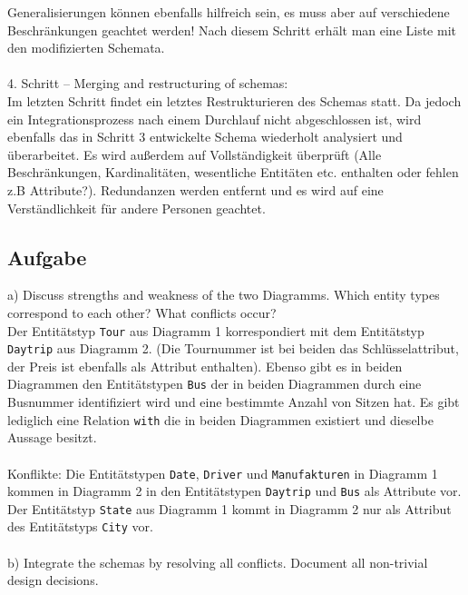 \documentclass[11pt,a4paper,DIV=9]{scrartcl}
\newcounter{temp}
\newcommand{\aufgabe}[1]{
  \setcounter{temp}{\value{subsection}}
  \setcounter{subsection}{#1}
  \addtocounter{subsection}{-1}
  \subsection{Aufgabe}
  \setcounter{subsection}{\value{temp}}
}
\begin{document}
Generalisierungen k\"onnen ebenfalls hilfreich sein, es muss aber auf verschiedene Beschr\"ankungen geachtet werden!
Nach diesem Schritt erh\"alt man eine Liste mit den modifizierten Schemata.
\\\\ 4. Schritt -- Merging and restructuring of schemas: \\
Im letzten Schritt findet ein letztes Restrukturieren des Schemas statt. Da jedoch ein Integrationsprozess nach einem Durchlauf nicht abgeschlossen ist, wird ebenfalls das in Schritt 3 entwickelte Schema wiederholt analysiert und \"uberarbeitet. Es wird au{\ss}erdem auf Vollst\"andigkeit \"uberpr\"uft (Alle Beschr\"ankungen, Kardinalit\"aten, wesentliche Entit\"aten etc. enthalten oder fehlen z.B Attribute?). Redundanzen werden entfernt und es wird auf eine Verst\"andlichkeit f\"ur andere Personen geachtet.
\aufgabe{3}
a) Discuss strengths and weakness of the two Diagramms. Which entity types correspond to each other? What conflicts occur? \\ Der Entit\"atstyp \texttt{Tour} aus Diagramm 1 korrespondiert mit dem Entit\"atstyp \texttt{Daytrip} aus Diagramm 2. (Die Tournummer ist bei beiden das Schl\"usselattribut, der Preis ist ebenfalls als Attribut enthalten). Ebenso gibt es in beiden Diagrammen den Entit\"atstypen \texttt{Bus} der in beiden Diagrammen durch eine Busnummer identifiziert wird und eine bestimmte Anzahl von Sitzen hat. Es gibt lediglich eine Relation \texttt{with} die in beiden Diagrammen existiert und dieselbe Aussage besitzt. \\\\
Konflikte: Die Entit\"atstypen \texttt{Date}, \texttt{Driver} und \texttt{Manufakturen} in Diagramm 1 kommen in Diagramm 2 in den Entit\"atstypen \texttt{Daytrip} und \texttt{Bus} als Attribute vor. Der Entit\"atstyp \texttt{State} aus Diagramm 1 kommt in Diagramm 2 nur als Attribut des Entit\"atstyps \texttt{City} vor.
\\\\
b) Integrate the schemas by resolving all conflicts. Document all non-trivial design decisions. \\
\end{document}
